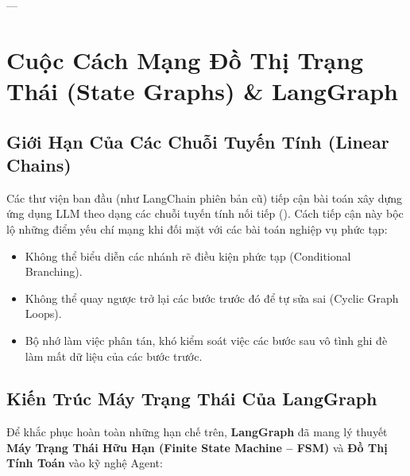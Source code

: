 ---

\section{Cuộc Cách Mạng Đồ Thị Trạng Thái (State Graphs) \& LangGraph}
\label{sec:langgraph-state-graphs}

\subsection{Giới Hạn Của Các Chuỗi Tuyến Tính (Linear Chains)}
Các thư viện ban đầu (như LangChain phiên bản cũ) tiếp cận bài toán xây dựng ứng dụng LLM theo dạng các chuỗi tuyến tính nối tiếp (). Cách tiếp cận này bộc lộ những điểm yếu chí mạng khi đối mặt với các bài toán nghiệp vụ phức tạp:
\begin{itemize}
  \item Không thể biểu diễn các nhánh rẽ điều kiện phức tạp (Conditional Branching).
  \item Không thể quay ngược trở lại các bước trước đó để tự sửa sai (Cyclic Graph Loops).
  \item Bộ nhớ làm việc phân tán, khó kiểm soát việc các bước sau vô tình ghi đè làm mất dữ liệu của các bước trước.
\end{itemize}

\subsection{Kiến Trúc Máy Trạng Thái Của LangGraph}
Để khắc phục hoàn toàn những hạn chế trên, \textbf{LangGraph} đã mang lý thuyết \textbf{Máy Trạng Thái Hữu Hạn (Finite State Machine -- FSM)} và \textbf{Đồ Thị Tính Toán} vào kỹ nghệ Agent:

